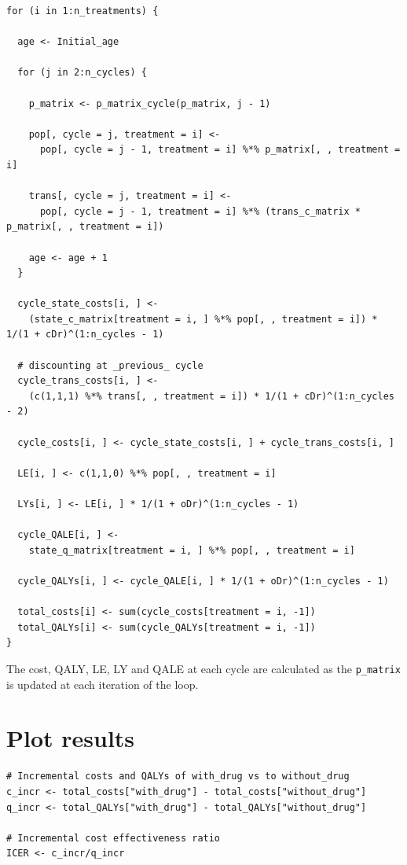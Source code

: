 \documentclass[a4paper,twoside,openany]{../svmonoBUGS}\usepackage[]{graphicx}\usepackage[]{color}
\begin{document}
\begin{verbatim}
for (i in 1:n_treatments) {
  
  age <- Initial_age
  
  for (j in 2:n_cycles) {
    
    p_matrix <- p_matrix_cycle(p_matrix, j - 1)
    
    pop[, cycle = j, treatment = i] <-
      pop[, cycle = j - 1, treatment = i] %*% p_matrix[, , treatment = i]
    
    trans[, cycle = j, treatment = i] <-
      pop[, cycle = j - 1, treatment = i] %*% (trans_c_matrix * p_matrix[, , treatment = i])
    
    age <- age + 1
  }
  
  cycle_state_costs[i, ] <-
    (state_c_matrix[treatment = i, ] %*% pop[, , treatment = i]) * 1/(1 + cDr)^(1:n_cycles - 1)
  
  # discounting at _previous_ cycle
  cycle_trans_costs[i, ] <-
    (c(1,1,1) %*% trans[, , treatment = i]) * 1/(1 + cDr)^(1:n_cycles - 2)
  
  cycle_costs[i, ] <- cycle_state_costs[i, ] + cycle_trans_costs[i, ]
  
  LE[i, ] <- c(1,1,0) %*% pop[, , treatment = i]
  
  LYs[i, ] <- LE[i, ] * 1/(1 + oDr)^(1:n_cycles - 1)
  
  cycle_QALE[i, ] <-
    state_q_matrix[treatment = i, ] %*% pop[, , treatment = i]
  
  cycle_QALYs[i, ] <- cycle_QALE[i, ] * 1/(1 + oDr)^(1:n_cycles - 1)
  
  total_costs[i] <- sum(cycle_costs[treatment = i, -1])
  total_QALYs[i] <- sum(cycle_QALYs[treatment = i, -1])
}
\end{verbatim}

The cost, QALY, LE, LY and QALE at each cycle are calculated as the \texttt{p\_matrix} is updated at each iteration of the loop.



\section{Plot results}

\begin{verbatim}
# Incremental costs and QALYs of with_drug vs to without_drug
c_incr <- total_costs["with_drug"] - total_costs["without_drug"]
q_incr <- total_QALYs["with_drug"] - total_QALYs["without_drug"]

# Incremental cost effectiveness ratio 
ICER <- c_incr/q_incr
\end{verbatim}
\end{document}
